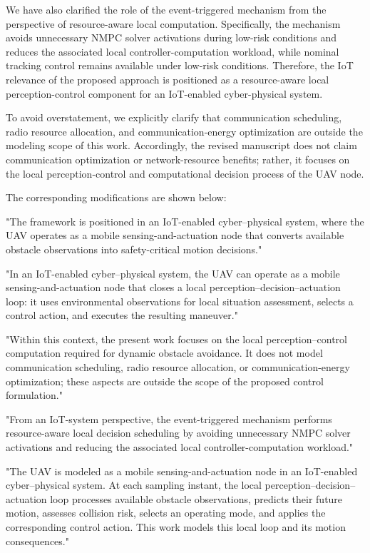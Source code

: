 \documentclass[12pt, twosides]{article}
\theoremstyle{definition}
\begin{document}
We have also clarified the role of the event-triggered mechanism from the perspective of resource-aware local computation. Specifically, the mechanism avoids unnecessary NMPC solver activations during low-risk conditions and reduces the associated local controller-computation workload, while nominal tracking control remains available under low-risk conditions. Therefore, the IoT relevance of the proposed approach is positioned as a resource-aware local perception-control component for an IoT-enabled cyber-physical system.

To avoid overstatement, we explicitly clarify that communication scheduling, radio resource allocation, and communication-energy optimization are outside the modeling scope of this work. Accordingly, the revised manuscript does not claim communication optimization or network-resource benefits; rather, it focuses on the local perception-control and computational decision process of the UAV node.

The corresponding modifications are shown below:

"The framework is positioned in an IoT-enabled cyber--physical system, where the UAV operates as a mobile sensing-and-actuation node that converts available obstacle observations into safety-critical motion decisions."

"In an IoT-enabled cyber--physical system, the UAV can operate as a mobile sensing-and-actuation node that closes a local perception--decision--actuation loop: it uses environmental observations for local situation assessment, selects a control action, and executes the resulting maneuver."

"Within this context, the present work focuses on the local perception--control computation required for dynamic obstacle avoidance. It does not model communication scheduling, radio resource allocation, or communication-energy optimization; these aspects are outside the scope of the proposed control formulation."

"From an IoT-system perspective, the event-triggered mechanism performs resource-aware local decision scheduling by avoiding unnecessary NMPC solver activations and reducing the associated local controller-computation workload."

"The UAV is modeled as a mobile sensing-and-actuation node in an IoT-enabled cyber--physical system. At each sampling instant, the local perception--decision--actuation loop processes available obstacle observations, predicts their future motion, assesses collision risk, selects an operating mode, and applies the corresponding control action. This work models this local loop and its motion consequences."
\end{document}
